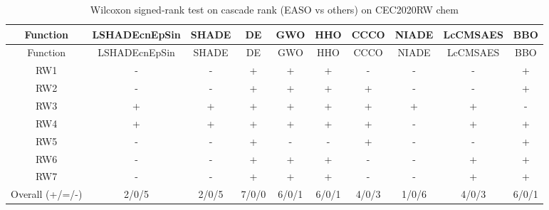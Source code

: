 \begin{center}
\small
\renewcommand{\arraystretch}{1.25}
\begin{longtable}{cccccccccc}
\caption{Wilcoxon signed-rank test on cascade rank (EASO vs others) on CEC2020RW  chem}
\label{tab:wilcoxon_cascade_CEC2020RW_chem} \\
\toprule
Function & LSHADEcnEpSin & SHADE & DE & GWO & HHO & CCCO & NIADE & LcCMSAES & BBO \\
\midrule
\endfirsthead
\toprule
Function & LSHADEcnEpSin & SHADE & DE & GWO & HHO & CCCO & NIADE & LcCMSAES & BBO \\
\midrule
\endhead
RW1 & - & - & + & + & + & - & - & - & + \\
RW2 & - & - & + & + & + & + & - & - & + \\
RW3 & + & + & + & + & + & + & + & + & - \\
RW4 & + & + & + & + & + & + & - & + & + \\
RW5 & - & - & + & - & - & + & - & - & + \\
RW6 & - & - & + & + & + & - & - & + & + \\
RW7 & - & - & + & + & + & - & - & + & + \\
\midrule
Overall (+/=/-) & 2/0/5 & 2/0/5 & 7/0/0 & 6/0/1 & 6/0/1 & 4/0/3 & 1/0/6 & 4/0/3 & 6/0/1 \\
\bottomrule
\end{longtable}
\end{center}